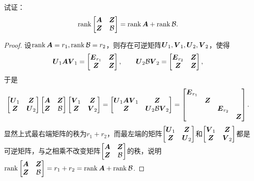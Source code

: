 \begin{example}
试证：\begin{equation}
	\rank\begin{bmatrix} \boldsymbol{A} & \boldsymbol{Z} \\ \boldsymbol{Z} & \mathcal{B} \end{bmatrix} = \rank\boldsymbol{A} + \rank\mathcal{B}.
	\label{equation:矩阵的秩.分块矩阵的秩的等式1}
\end{equation}
\begin{proof}
设\(\rank\boldsymbol{A} = r_1, \rank\mathcal{B} = r_2\)，则存在可逆矩阵\(\P_1,\Q_1,\P_2,\Q_2\)，使得\[
\P_1 \A \Q_1 = \begin{bmatrix}
\E_{r_1} & \z \\
\z & \z
\end{bmatrix},
\qquad
\P_2 \B \Q_2 = \begin{bmatrix}
\E_{r_2} & \z \\
\z & \z
\end{bmatrix},
\]于是\[
\begin{bmatrix}
\P_1 & \z \\
\z & \P_2
\end{bmatrix} \begin{bmatrix}
\A & \z \\
\z & \B
\end{bmatrix} \begin{bmatrix}
\Q_1 & \z \\
\z & \Q_2
\end{bmatrix}
= \begin{bmatrix}
\P_1 \A \Q_1 & \z \\
\z & \P_2 \B \Q_2
\end{bmatrix}
= \begin{bmatrix}
\E_{r_1} \\
& \z \\
& & \E_{r_2} \\
& & & \z
\end{bmatrix}.
\]显然上式最右端矩阵的秩为\(r_1+r_2\)，而最左端的矩阵\(\begin{bmatrix}
\P_1 & \z \\
\z & \P_2
\end{bmatrix}\)和\(\begin{bmatrix}
\Q_1 & \z \\
\z & \Q_2
\end{bmatrix}\)都是可逆矩阵，与之相乘不改变矩阵\(\begin{bmatrix} \boldsymbol{A} & \boldsymbol{Z} \\ \boldsymbol{Z} & \mathcal{B} \end{bmatrix}\)的秩，说明\(\rank\begin{bmatrix} \boldsymbol{A} & \boldsymbol{Z} \\ \boldsymbol{Z} & \mathcal{B} \end{bmatrix} = r_1 + r_2 = \rank\boldsymbol{A} + \rank\mathcal{B}\).
\end{proof}
\end{example}

